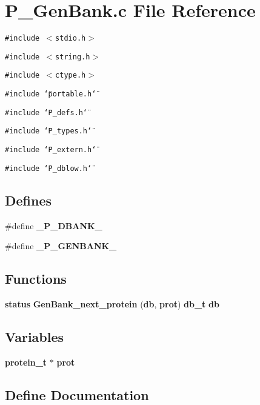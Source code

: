 \section{P\_\-Gen\-Bank.c File Reference}
\label{P__GenBank_8c}
{\tt \#include $<$stdio.h$>$}\par
{\tt \#include $<$string.h$>$}\par
{\tt \#include $<$ctype.h$>$}\par
{\tt \#include \char`\"{}portable.h\char`\"{}}\par
{\tt \#include \char`\"{}P\_\-defs.h\char`\"{}}\par
{\tt \#include \char`\"{}P\_\-types.h\char`\"{}}\par
{\tt \#include \char`\"{}P\_\-extern.h\char`\"{}}\par
{\tt \#include \char`\"{}P\_\-dblow.h\char`\"{}}\par
\subsection*{Defines}
\begin{CompactItemize}
\item 
\#define {\bf \_\-P\_\-DBANK\_\-}
\item 
\#define {\bf \_\-P\_\-GENBANK\_\-}
\end{CompactItemize}
\subsection*{Functions}
\begin{CompactItemize}
\item 
{\bf status} {\bf Gen\-Bank\_\-next\_\-protein} ({\bf db}, {\bf prot}) {\bf db\_\-t} {\bf db}
\end{CompactItemize}
\subsection*{Variables}
\begin{CompactItemize}
\item 
{\bf protein\_\-t} $\ast$ {\bf prot}
\end{CompactItemize}


\subsection{Define Documentation}

